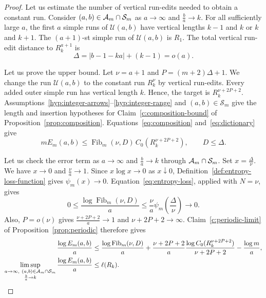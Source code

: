 \begin{proof}
 Let us estimate the number of vertical run-edits needed to obtain a constant run.
Consider $(a,b)\in\mathcal A_m\cap\mathcal S_m$ as $a\to\infty$ and $\frac ba\to k$.
For all sufficiently large $a$, the first $a$ simple runs of $\mathcal{U}(a,b)$ have
vertical lengths $k-1$ and $k$ or $k$ and $k+1$. The $(a+1)$-st simple run of $\mathcal U(a,b)$ is $R_1$. The total vertical run-edit distance to $R_k^{a+1}$ is
\[
 \Delta=|b-1-ka|+(k-1)=o(a).
\]

Let us prove the upper bound. Let $\nu=a+1$ and $P=(m+2)\Delta+1$. We change the run $\mathcal{U}(a,b)$ to the constant run $R_k^\nu$ by vertical run-edits. Every added outer simple run has vertical length $k$. Hence, the target is $R_k^{\nu+2P+2}$.
Assumptions~\ref{hyp:integer-arrows}--\ref{hyp:integer-range} and $(a,b)\in\mathcal S_m$ give the length and insertion hypotheses for Claim~\ref{c:composition-bound} of Proposition~\ref{prop:composition}.
Equations~\eqref{eq:composition} and~\eqref{eq:dictionary} give
\[
 mE_m(a,b)\le \operatorname{Fib}_m(\nu,D)\,C_0(R_k^{\nu+2P+2}),\qquad D\le\Delta.
\]

Let us check the error term as $a\to\infty$ and $\frac ba\to k$ through $\mathcal A_m\cap\mathcal S_m$.
Set $x=\frac{\Delta}{\nu}$. We have $x\to0$ and $\frac\nu a\to1$.
Since $x\log x\to0$ as $x\downarrow0$, Definition~\ref{def:entropy-loss-function} gives $\psi_m(x)\to0$.
Equation~\eqref{eq:entropy-loss}, applied with $N=\nu$, gives
\[
 0\le\frac{\log\operatorname{Fib}_m(\nu,D)}a
 \le\frac\nu a\psi_m\left(\frac\Delta\nu\right)\longrightarrow0.
\]
Also, $P=o(\nu)$ gives $\frac{\nu+2P+2}{a}\to1$ and $\nu+2P+2\to\infty$.
Claim~\ref{c:periodic-limit} of Proposition~\ref{prop:periodic} therefore gives
\[
\begin{aligned}
 \frac{\log E_m(a,b)}a
 &\le\frac{\log \operatorname{Fib}_m(\nu,D)}a
 +\frac{\nu+2P+2}{a}\frac{\log C_0(R_k^{\nu+2P+2})}{\nu+2P+2}
 -\frac{\log m}{a},\\
 \limsup_{\substack{a\to\infty,\ (a,b)\in\mathcal A_m\cap\mathcal S_m\\\frac{b}{a}\to k}}
 \frac{\log E_m(a,b)}a&\le\ell(R_k).
\end{aligned}
\]


\end{proof}
